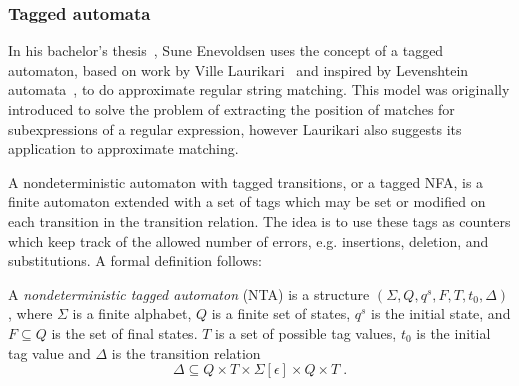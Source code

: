 


\subsubsection{Tagged automata}

In his bachelor's thesis~\cite{enevoldsen2015pattern}, Sune Enevoldsen uses the
concept of a tagged automaton, based on work by Ville
Laurikari~\cite{laurikari2000nfas, laurikari2001efficient} and inspired by
Levenshtein automata~\cite{schulz2002fast}, to do approximate regular string
matching. This model was originally introduced to solve the problem of
extracting the position of matches for subexpressions of a regular expression,
however Laurikari also suggests its application to approximate matching.

A nondeterministic automaton with tagged transitions, or a tagged NFA, is a
finite automaton extended with a set of tags which may be set or modified on
each transition in the transition relation. The idea is to use these tags as
counters which keep track of the allowed number of errors, e.g. insertions,
deletion, and substitutions. A formal definition follows:


\begin{definition}[NTA] 
  A \emph{nondeterministic tagged automaton} (NTA) is a structure
  $(\Sigma, Q, q^s, F, T, t_0, \Delta)$, where $\Sigma$ is a finite alphabet,
  $Q$ is a finite set of states, $q^s$ is the initial state, and
  $F \subseteq Q$ is the set of final states. $T$ is a set of possible tag
  values, $t_0$ is the initial tag value and $\Delta$ is the transition
  relation
  \[
    \Delta \subseteq Q \times T \times \Sigma[\epsilon] \times Q \times T \;.
  \]
\end{definition}

